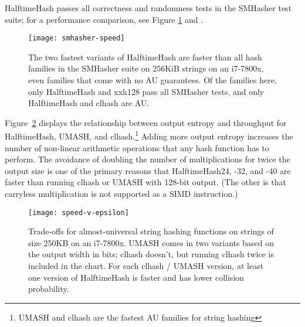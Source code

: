 \documentclass[runningheads]{llncs}
\begin{document}
HalftimeHash passes all correctness and randomness tests in the SMHasher test suite; for a performance comparison, see Figure \ref{smhasher-speed} and \cite{smhasher}.

\begin{figure}
  \texttt{[image: smhasher-speed]}
\caption{
  \label{smhasher-speed}
    The two fastest variants of HalftimeHash are faster than all hash families in the SMHasher suite on 256KiB strings on an i7-7800x, even families that come with no AU guarantees. \protect\cite{smhasher}
    Of the families here, only HalftimeHash and xxh128 pass all SMHasher tests, and only HalftimeHash and clhash are AU.
}
\end{figure}

Figure~\ref{frontier} displays the relationship between output entropy and throughput for HalftimeHash, UMASH, and clhash.\footnote{UMASH and clhash are the fastest AU families for string hashing}
Adding more output entropy increases the number of non-linear arithmetic operations that any hash function has to perform.\cite{ehc-nandi}
The avoidance of doubling the number of multiplications for twice the output size is one of the primary reasons that HalftimeHash24, -32, and -40 are faster than running clhash or UMASH with 128-bit output.
(The other is that carryless multiplication is not supported as a SIMD instruction.)

\begin{figure}
\texttt{[image: speed-v-epsilon]}
\caption{
  \label{frontier}
  Trade-offs for almost-universal string hashing functions on strings of size 250KB on an i7-7800x.
  UMASH comes in two variants based on the output width in bits; clhash doesn't, but running clhash twice is included in the chart.
  For each clhash / UMASH version, at least one version of HalftimeHash is faster and has lower collision probability.%
}
\end{figure}
\end{document}

